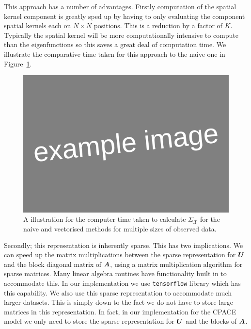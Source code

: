 This approach has a number of advantages.
Firstly computation of the spatial kernel component is greatly sped up by having to only evaluating the component spatial kernels each on $N \times N$ positions.
This is a reduction by a factor of $K$.
Typically the spatial kernel will be more computationally intensive to compute than the eigenfunctions so this saves a great deal of computation time.
We illustrate the comparative time taken for this approach to the naive one in Figure~\ref{fig:imp_utau}.
\begin{figure}
	\centering
	\includegraphics[width=\textwidth]{example_image}
	\caption{A illustration for the computer time taken to calculate $\Sigma_\mathcal{X}$ for the naive and vectorised methods for multiple sizes of observed data.}
	\label{fig:imp_utau}
\end{figure}
Secondly; this representation is inherently sparse.
This has two implications.
We can speed up the matrix multiplications between the sparse representation for $\bm{{U}}$ and the block diagonal matrix of $\bm{{A}}$, using a matrix multiplication algorithm for sparse matrices. 
Many linear algebra routines have functionality built in to accommodate this.
In our implementation we use \verb*|tensorflow| library which has this capability. 
We also use this sparse representation to accommodate much larger datasets.
This is simply down to the fact we do not have to store large matrices in this representation.
In fact, in our implementation for the CPACE model we only need to store the sparse representation for $\bm{{U}}$ and the blocks of $\bm{{A}}$. 

